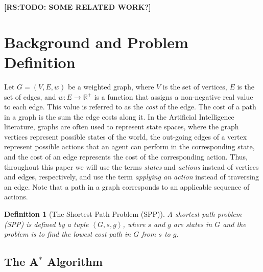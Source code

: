 \documentclass{aicom2e}
\newtheorem{definition}{Definition}
\newcommand{\astar}{A$^*$}
\newcommand{\tuple}[1]{\ensuremath{\left \langle #1 \right \rangle }}
\newcommand{\roni}[1]{\textbf{[RS:#1]}}
\begin{document}
\roni{TODO: SOME RELATED WORK?}

\section{Background and Problem Definition}


Let $G=(V,E,w)$ be a weighted graph, where $V$ is the set of vertices, $E$ is the set of edges, and $w:E\rightarrow \mathbb{R}^+$ is a function that assigns a non-negative real value to each edge. This value is referred to as the {\em cost} of the edge. The cost of a path in a graph is the sum the edge costs along it. 
In the Artificial Intelligence literature, graphs are often used to represent state spaces, 
where the graph vertices represent possible states of the world, the out-going edges of a vertex represent possible actions that an agent can perform in the corresponding state, and the cost of an edge represents the cost of the corresponding action. 
Thus, throughout this paper we will use the terms {\em states} and {\em actions} instead of vertices and edges, respectively, and use the term {\em applying an action} instead of traversing an edge. Note that a path in a graph corresponds to an applicable sequence of actions. 

\begin{definition}[The Shortest Path Problem (SPP)]
A shortest path problem (SPP) is defined by a tuple $\tuple{G,s,g}$, where $s$
and $g$ are states in $G$ and the problem is to find the lowest cost path in
$G$ from $s$ to $g$. \label{def:spp}
\end{definition}

\subsection{The \astar{} Algorithm}
\end{document}
